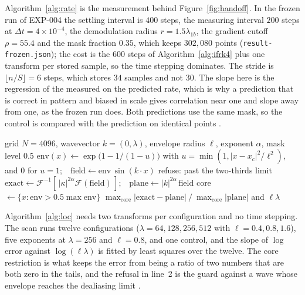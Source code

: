 \documentclass[11pt]{article}
\theoremstyle{remark}
\newcommand{\ev}[1]{\hspace{0.2em}{\small\textsf{[#1]}}}
\newcommand{\fp}[1]{\nolinkurl{#1}}
\begin{document}
Algorithm~\ref{alg:rate} is the measurement behind Figure~\ref{fig:handoff}. In the frozen run of EXP-004
the settling interval is $400$ steps, the measuring interval $200$ steps at $\Delta t=4\times10^{-4}$, the
demodulation radius $r=1.5\lambda_{1b}$, the gradient cutoff $\rho=55.4$ and the mask fraction $0.35$, which keeps $302{,}080$ points
(\fp{result-frozen.json}); the cost is the $600$ steps of Algorithm~\ref{alg:ifrk4} plus one transform per stored sample, so the time
stepping dominates. The stride is $\lfloor n/S\rfloor=6$ steps, which stores $34$ samples and not $30$. The slope here is the regression of the measured on the
predicted rate, which is why a prediction that is correct in pattern and biased in scale gives correlation
near one and slope away from one, as the frozen run does. Both predictions use the same mask, so the control
is compared with the prediction on identical points \ev{D}.

\begin{algorithm}[t]
\caption{Test of the plane-wave damping law on a localized wave (EXP-007).}\label{alg:loc}
\begin{algorithmic}[1]
\Require grid $N=4096$, wavevector $k=(0,\lambda)$, envelope radius $\ell$, exponent $\alpha$, mask level $0.5$
\State $\mathrm{env}(x)\gets\exp\bigl(1-1/(1-u)\bigr)$ with $u=\min(1,|x-x_{c}|^{2}/\ell^{2})$, and $0$ for $u=1$;\ \ $\mathrm{field}\gets\mathrm{env}\,\sin(k\cdot x)$
 \State \Return refuse: past the two-thirds limit \EndIf
\State $\mathrm{exact}\gets\mathcal F^{-1}[\,|\kappa|^{2\alpha}\mathcal F(\mathrm{field})\,]$;\ \ $\mathrm{plane}\gets|k|^{2\alpha}\,\mathrm{field}$
\State core $\gets\{x:\mathrm{env}>0.5\max\mathrm{env}\}$
\State \Return $\max_{\mathrm{core}}|\mathrm{exact}-\mathrm{plane}|\ /\ \max_{\mathrm{core}}|\mathrm{plane}|$ and $\ell\lambda$
\end{algorithmic}
\end{algorithm}

Algorithm~\ref{alg:loc} needs two transforms per configuration and no time stepping. The scan runs twelve
configurations ($\lambda=64,128,256,512$ with $\ell=0.4,0.8,1.6$), five exponents at $\lambda=256$ and
$\ell=0.8$, and one control, and the slope of $\log$ error against $\log(\ell\lambda)$ is fitted by least squares
over the twelve. The core restriction is what keeps the error from being a ratio of two numbers that are both
zero in the tails, and the refusal in line~2 is the guard against a wave whose envelope reaches the dealiasing
limit \ev{D}.
\end{document}
